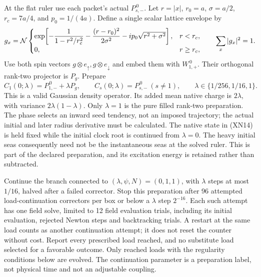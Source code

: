 \documentclass[11pt]{article}
\begin{document}
At the flat ruler use each packet's actual $P_{s,-}^{\,0}$.
Let $r=|x|$, $r_0=a$, $\sigma=a/2$, $r_c=7a/4$, and $p_0=1/(4a)$.
Define a single scalar lattice envelope by
\[
 g_x={\cal N}
 \begin{cases}
 \exp\!\left[-\dfrac1{1-r^2/r_c^2}
            -\dfrac{(r-r_0)^2}{2\sigma^2}
            -ip_0\sqrt{r^2+\sigma^2}\right],&r<r_c,\\
 0,&r\geq r_c ,
 \end{cases}
 \qquad \sum_x|g_x|^2=1 .
\]
Use both spin vectors $g\otimes e_\uparrow,g\otimes e_\downarrow$
and embed them with $W_{1,+}^{\,0}$.  Their orthogonal rank-two
projector is $P_g$.  Prepare
\begin{equation}
 C_{1}(0;\lambda)=P_{1,-}^{\,0}+\lambda P_g,\qquad
 C_s(0;\lambda)=P_{s,-}^{\,0}\ (s\ne1),\qquad
 \lambda\in\{1/256,1/16,1\}.
 \tag{XN14}
\end{equation}
This is a valid Gaussian density operator.  Its added mean native
charge is $2\lambda$, with variance $2\lambda(1-\lambda)$.
Only $\lambda=1$ is the pure filled rank-two preparation.
The phase selects an inward seed tendency, not an imposed
trajectory; the actual initial and later radius derivative must
be calculated.  The native state in (XN14) is held fixed while
the initial clock root is continued from $\lambda=0$.
The heavy initial seas consequently need not be the instantaneous
seas at the solved ruler.  This is part of the declared preparation,
and its excitation energy is retained rather than subtracted.

Continue the branch connected to $(\lambda,\psi,N)=(0,1,1)$,
with $\lambda$ steps at most $1/16$, halved after a failed corrector.
Stop this preparation after 96 attempted load-continuation
correctors per box or below a $\lambda$ step $2^{-16}$.
Each such attempt has one field solve, limited to 12 field
evaluation trials, including its initial evaluation, rejected
Newton steps and backtracking trials.  A restart at the same
load counts as another continuation attempt; it does not reset
the counter without cost.  Report every prescribed load
reached, and no substitute load selected for a favorable outcome.
Only reached loads with the regularity conditions below are evolved.
The continuation parameter is a preparation label, not physical time
and not an adjustable coupling.
\end{document}
